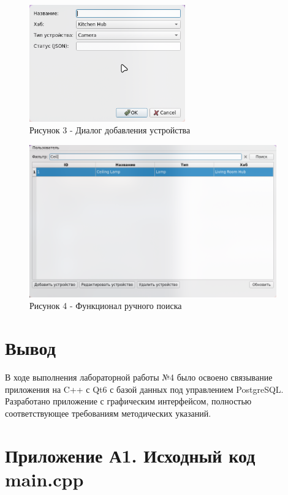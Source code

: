 \documentclass[oneside,a4paper,14pt]{extarticle}
\begin{document}
\begin{figure}[H]
  \centering
  \includegraphics[width=0.6\textwidth]{pics/device_dialog.png}
  \caption*{Рисунок 3 - Диалог добавления устройства}
\end{figure}

\begin{figure}[H]
  \centering
  \includegraphics[width=0.95\textwidth]{pics/search_functionality.png}
  \caption*{Рисунок 4 - Функционал ручного поиска}
\end{figure}

\section*{Вывод}

В ходе выполнения лабораторной работы №4 было освоено связывание приложения на C++ с Qt6 с базой данных под управлением PostgreSQL. Разработано приложение с графическим интерфейсом, полностью соответствующее требованиям методических указаний.

\newpage

\section*{Приложение А1. Исходный код main.cpp}
\inputminted{cpp}{code/src/main.cpp}
\end{document}
